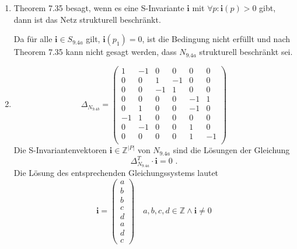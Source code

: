 \documentclass[a4paper]{scrartcl}
\begin{document}
\begin{enumerate}
    \item
        Theorem 7.35 besagt, wenn es eine S-Invariante $\textbf{i}$ mit
        $\forall p : \textbf{i}(p) > 0$ gibt, dann ist das Netz strukturell beschränkt.

        Da für alle $\textbf{i} \in S_{9.4a}$ gilt, $\textbf{i}(p_1) = 0$, ist die Bedingung nicht
        erfüllt und nach Theorem 7.35 kann nicht gesagt werden, dass $N_{9.4a}$
        strukturell beschränkt sei.

    \item
        \begin{equation}
            \Delta_{N_{9.4b}} =
            \begin{pmatrix}
                 1 & -1 &  0 &  0 &  0 &  0 \\
                 0 &  0 &  1 & -1 &  0 &  0 \\
                 0 &  0 & -1 &  1 &  0 &  0 \\
                 0 &  0 &  0 &  0 & -1 &  1 \\
                 0 &  1 &  0 &  0 & -1 &  0 \\
                -1 &  1 &  0 &  0 &  0 &  0 \\
                 0 & -1 &  0 &  0 &  1 &  0 \\
                 0 &  0 &  0 &  0 &  1 & -1 \\
            \end{pmatrix}
        \end{equation}
        Die S-Invariantenvektoren $\textbf{i} \in \mathbb{Z}^{|P|}$ von $N_{9.4a}$ sind
        die Lösungen der Gleichung
        \begin{equation}
            \Delta_{N_{9.4a}}^T \cdot \textbf{i} = 0 \text{ .}
        \end{equation}
        Die Lösung des entsprechenden Gleichungssystems lautet
        \begin{equation}
            \textbf{i} =
            \begin{pmatrix}
                a \\ b \\ b \\ c \\ d \\ a \\ d \\ c
            \end{pmatrix}
            \quad
            a, b, c, d \in \mathbb{Z} \land \textbf{i} \neq 0
        \end{equation}

\end{enumerate}
\end{document}
